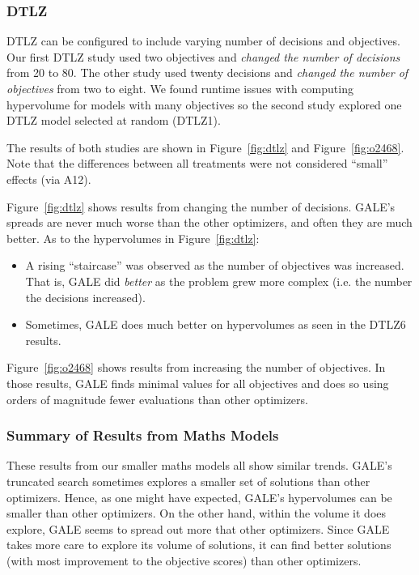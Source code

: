\documentclass[10pt,journal,compsoc]{IEEEtran}
\newcommand{\bi}{\begin{itemize}}
\newcommand{\ei}{\end{itemize}}
\newcommand{\fig}[1]{Figure~\ref{fig:#1}}
\newenvironment{changed}{\par\color{MyDarkBlue}}{\par}
\newcommand{\addit}[1]{\begin{changed}\end{changed}}
\begin{document}
\begin{changed}
\subsubsection{DTLZ}

 DTLZ  can be configured to include varying number of decisions
and objectives.  
Our first DTLZ study used two objectives and  {\em changed the number of decisions} from 20 to 80. The other study used twenty decisions and  {\em changed
the number of objectives} from two to eight. We found
 runtime issues with  computing hypervolume for models with many objectives
 so  the  second study  explored one DTLZ model selected at random (DTLZ1).

The results of both studies are shown in \fig{dtlz}
and \fig{o2468}. Note that the differences
between all treatments were not considered ``small'' effects (via A12).

\fig{dtlz} shows results from changing the number of decisions.
GALE's spreads are never much worse than the other
optimizers, and often they are much
better. 
As to the hypervolumes in  \fig{dtlz}:
\bi
\item
A rising ``staircase'' was observed as the number of
objectives was increased. That is,  GALE did {\em better}
as the problem grew more complex (i.e. the number the decisions increased).
\item
Sometimes, GALE does much better on hypervolumes as
seen in the DTLZ6 results.
\ei
\fig{o2468} shows results from increasing the
number of objectives. 
In those results,   GALE 
finds minimal values for all objectives and does
so using  orders of magnitude fewer evaluations than
 other optimizers.
 \addit{xomoresults}




\subsubsection{Summary of Results from Maths Models}

These results from our smaller maths models all show similar trends.
GALE's truncated search sometimes explores a
smaller set of solutions than other
optimizers.  Hence, as one might have expected, GALE's hypervolumes can be smaller than other optimizers. On the other hand,
within the volume it does explore, GALE seems to spread
out more that other optimizers.
Since GALE takes more care to explore its volume of solutions,
it can find better solutions (with most improvement to the objective scores)
than other optimizers.
\end{changed}
\end{document}
